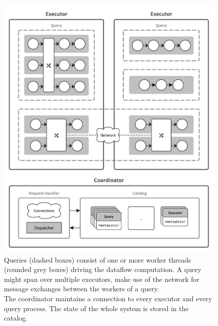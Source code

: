 \begin{figure}[p]
  \centering
    \includegraphics[width=1\textwidth]{figures/components}
  \caption[System architecture.]{ Queries (dashed boxes) consist of one or
  more worker threads (rounded grey boxes) driving the dataflow computation.
  A query might span over multiple executors, make use of the network for message exchanges
  between the workers of a query.\\
  The coordinator maintains a connection to every  executor and every query process.
  The state of the whole system is stored in the catalog.}
  \label{fig:components}
\end{figure}

